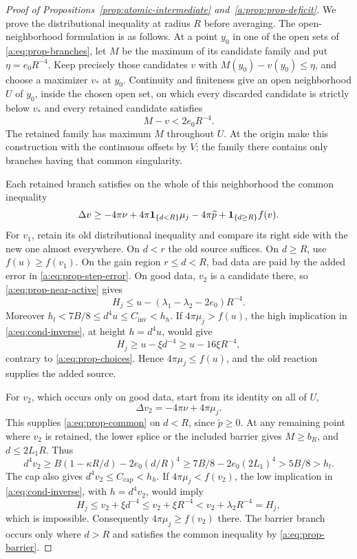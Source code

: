 \begin{proof}[Proof of Propositions~\ref{prop:atomic-intermediate} and~\ref{a:prop:prop-deficit}]
We prove the distributional inequality at radius $R$ before averaging.
The open-neighborhood formulation is as follows.  At a point $y_0$ in
one of the open sets of \eqref{a:eq:prop-branches}, let $M$ be the maximum
of its candidate family and put $\eta=e_0R^{-4}$.  Keep precisely those
candidates $v$ with $M(y_0)-v(y_0)\le\eta$, and choose a maximizer
$v_*$ at $y_0$.  Continuity and finiteness give an open neighborhood
$U$ of $y_0$, inside the chosen open set, on which every discarded
candidate is strictly below $v_*$ and every retained candidate satisfies
\begin{equation}
\label{a:eq:prop-near-active}
 M-v<2e_0R^{-4}.
\end{equation}
The retained family has maximum $M$ throughout $U$.  At the origin
make this construction with the continuous offsets by $V$; the family
there contains only branches having that common singularity.

Each retained branch satisfies on the whole of this neighborhood the
common inequality
\begin{equation}
\label{a:eq:prop-common}
 \Delta v\ge-4\pi\nu+4\pi\mathbf 1_{\{d<R\}}\mu_j
          -4\pi\widetilde p+\mathbf 1_{\{d\ge R\}}f(v).
\end{equation}
For $v_1$, retain its old distributional inequality and compare its
right side with the new one almost everywhere.  On $d<r$ the old
source suffices.  On $d\ge R$, use $f(u)\ge f(v_1)$.  On the gain
region $r\le d<R$, bad data are paid by the added error in
\eqref{a:eq:prop-step-error}.  On good data, $v_2$ is a candidate there,
so \eqref{a:eq:prop-near-active} gives
\[
 H_j\le u-(\lambda_1-\lambda_2-2e_0)R^{-4}.
\]
Moreover $h_l<7B/8\le d^4u\le C_{\mathrm{inv}}<h_h$.
If $4\pi\mu_j>f(u)$, the high implication in
\eqref{a:eq:cond-inverse}, at height $h=d^4u$, would give
\[
 H_j\ge u-\xi d^{-4}\ge u-16\xi R^{-4},
\]
contrary to \eqref{a:eq:prop-choices}.  Hence
$4\pi\mu_j\le f(u)$, and the old reaction supplies the added source.

For $v_2$, which occurs only on good data, start from its identity on
all of $U$,
\[
 \Delta v_2=-4\pi\nu+4\pi\mu_j.
\]
This supplies \eqref{a:eq:prop-common} on $d<R$, since
$\widetilde p\ge0$.  At any remaining point where $v_2$ is retained,
the lower splice or the included barrier gives $M\ge b_R$, and
$d\le2L_1R$.  Thus
\[
 d^4v_2\ge B(1-\kappa R/d)-2e_0(d/R)^4
 \ge7B/8-2e_0(2L_1)^4>5B/8>h_l.
\]
The cap also gives $d^4v_2\le C_{\mathrm{cap}}<h_h$.
If $4\pi\mu_j<f(v_2)$, the low implication in
\eqref{a:eq:cond-inverse}, with $h=d^4v_2$, would imply
\[
 H_j\le v_2+\xi d^{-4}
       \le v_2+\xi R^{-4}<v_2+\lambda_2R^{-4}=H_j,
\]
which is impossible.  Consequently $4\pi\mu_j\ge f(v_2)$ there.
The barrier branch occurs only where $d>R$ and satisfies the common
inequality by \eqref{a:eq:prop-barrier}.


\end{proof}

